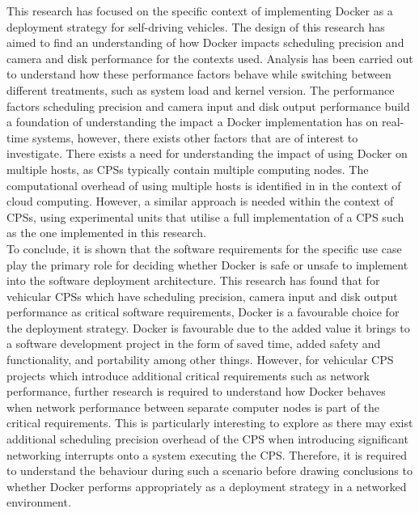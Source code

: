 This research has focused on the specific context of implementing Docker as a deployment strategy for self-driving vehicles. The design of this research has aimed to find an understanding of how Docker impacts scheduling precision and camera and disk performance for the contexts used. Analysis has been carried out to understand how these performance factors behave while switching between different treatments, such as system load and kernel version. The performance factors scheduling precision and camera input and disk output performance build a foundation of understanding the impact a Docker implementation has on real-time systems, however, there exists other factors that are of interest to investigate. There exists a need for understanding the impact of using Docker on multiple hosts, as CPSs typically contain multiple computing nodes. The computational overhead of using multiple hosts is identified in \cite{p1} in the context of cloud computing. However, a similar approach is needed within the context of CPSs, using experimental units that utilise a full implementation of a CPS such as the one implemented in this research.\\

To conclude, it is shown that the software requirements for the specific use case play the primary role for deciding whether Docker is safe or unsafe to implement into the software deployment architecture. This research has found that for vehicular CPSs which have scheduling precision, camera input and disk output performance as critical software requirements, Docker is a favourable choice for the deployment strategy. Docker is favourable due to the added value it brings to a software development project in the form of saved time, added safety and functionality, and portability among other things. However, for vehicular CPS projects which introduce additional critical requirements such as network performance, further research is required to understand how Docker behaves when network performance between separate computer nodes is part of the critical requirements. This is particularly interesting to explore as there may exist additional scheduling precision overhead of the CPS when introducing significant networking interrupts onto a system executing the CPS. Therefore, it is required to understand the behaviour during such a scenario before drawing conclusions to whether Docker performs appropriately as a deployment strategy in a networked environment.